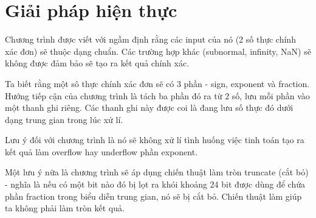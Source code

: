 \hypertarget{giux1ea3i-phuxe1p-hiux1ec7n-thux1ef1c}{%
\section{Giải pháp hiện
thực}\label{giux1ea3i-phuxe1p-hiux1ec7n-thux1ef1c}}

Chương trình được viết với ngầm định rằng các input của nó (2 số thực
chính xác đơn) sẽ thuộc dạng chuẩn. Các trường hợp khác (subnormal,
infinity, NaN) sẽ không được đảm bảo sẽ tạo ra kết quả chính xác.

Ta biết rằng một sô thực chính xác đơn sẽ có 3 phần - sign, exponent và
fraction. Hướng tiếp cận của chương trình là tách ba phần đó ra từ 2 số,
lưu mỗi phần vào một thanh ghi riêng. Các thanh ghi này được coi là đang
lưu số thực đó dưới dạng trung gian trong lúc xử lí.

Lưu ý đối với chương trình là nó sẽ không xử lí tình huống việc tinh
toán tạo ra kết quả làm overflow hay underflow phần exponent.

Một lưu ý nữa là chương trình sẽ áp dụng chiến thuật làm tròn truncate
(cắt bỏ) - nghĩa là nếu có một bit nào đó bị lọt ra khói khoảng 24 bit
được dùng để chứa phần fraction trong biểu diễn trung gian, nó sẽ bị cắt
bỏ. Chiến thuật làm giúp ta không phải làm tròn kết quả.

